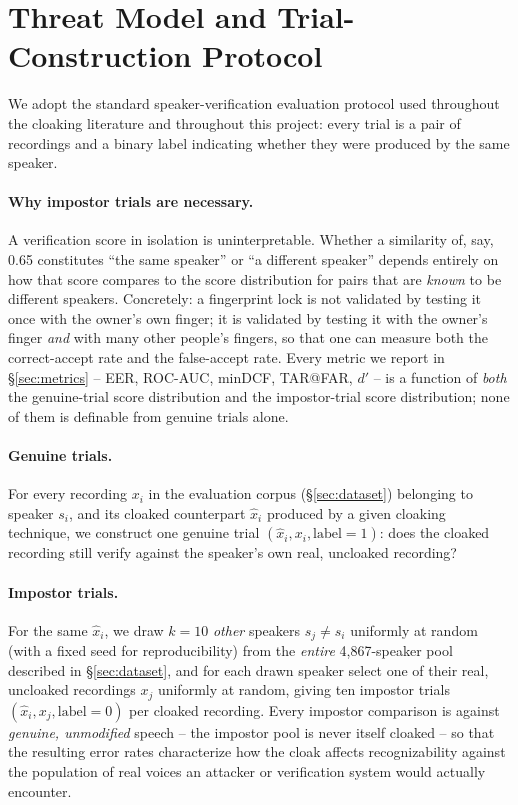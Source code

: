 \documentclass[11pt]{article}
\begin{document}
\section{Threat Model and Trial-Construction Protocol}
\label{sec:threat}

We adopt the standard speaker-verification evaluation protocol used
throughout the cloaking literature and throughout this project: every
trial is a pair of recordings and a binary label indicating whether
they were produced by the same speaker.

\paragraph{Why impostor trials are necessary.}
A verification score in isolation is uninterpretable. Whether a
similarity of, say, 0.65 constitutes ``the same speaker'' or ``a
different speaker'' depends entirely on how that score compares to the
score distribution for pairs that are \emph{known} to be different
speakers. Concretely: a fingerprint lock is not validated by testing it
once with the owner's own finger; it is validated by testing it with
the owner's finger \emph{and} with many other people's fingers, so
that one can measure both the correct-accept rate and the
false-accept rate. Every metric we report in \S\ref{sec:metrics} --
EER, ROC-AUC, minDCF, TAR@FAR, $d'$ -- is a function of \emph{both}
the genuine-trial score distribution and the impostor-trial score
distribution; none of them is definable from genuine trials alone.

\paragraph{Genuine trials.} For every recording $x_i$ in the evaluation
corpus (\S\ref{sec:dataset}) belonging to speaker $s_i$, and its
cloaked counterpart $\hat{x}_i$ produced by a given cloaking technique,
we construct one genuine trial $(\hat{x}_i, x_i, \text{label}=1)$: does
the cloaked recording still verify against the speaker's own real,
uncloaked recording?

\paragraph{Impostor trials.} For the same $\hat{x}_i$, we draw
$k=10$ \emph{other} speakers $s_j \neq s_i$ uniformly at random (with a
fixed seed for reproducibility) from the \emph{entire} 4,867-speaker
pool described in \S\ref{sec:dataset}, and for each drawn speaker
select one of their real, uncloaked recordings $x_j$ uniformly at
random, giving ten impostor trials $(\hat{x}_i, x_j, \text{label}=0)$
per cloaked recording. Every impostor comparison is against
\emph{genuine, unmodified} speech -- the impostor pool is never itself
cloaked -- so that the resulting error rates characterize how the
cloak affects recognizability against the population of real voices an
attacker or verification system would actually encounter.
\end{document}
